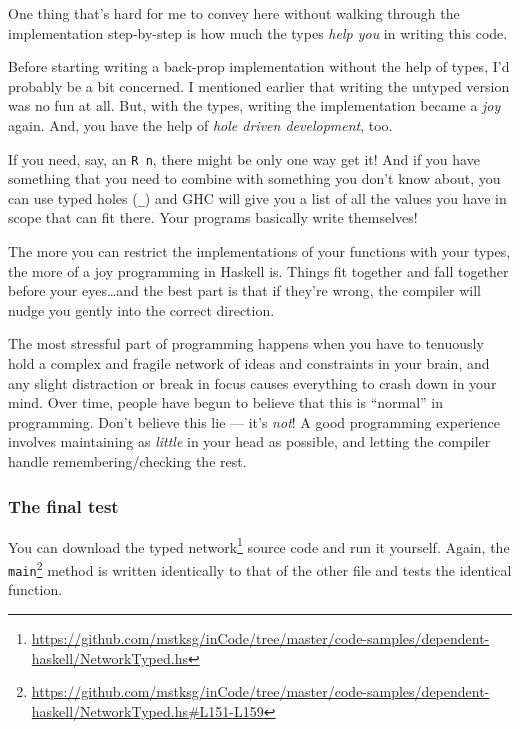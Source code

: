 \documentclass[]{article}
\renewcommand{\href}[2]{#2\footnote{\url{#1}}}
\begin{document}
One thing that's hard for me to convey here without walking through the
implementation step-by-step is how much the types \emph{help you} in writing
this code.

Before starting writing a back-prop implementation without the help of types,
I'd probably be a bit concerned. I mentioned earlier that writing the untyped
version was no fun at all. But, with the types, writing the implementation
became a \emph{joy} again. And, you have the help of \emph{hole driven
development}, too.

If you need, say, an \texttt{R\ n}, there might be only one way get it! And if
you have something that you need to combine with something you don't know about,
you can use typed holes (\texttt{\_}) and GHC will give you a list of all the
values you have in scope that can fit there. Your programs basically write
themselves!

The more you can restrict the implementations of your functions with your types,
the more of a joy programming in Haskell is. Things fit together and fall
together before your eyes\ldots and the best part is that if they're wrong, the
compiler will nudge you gently into the correct direction.

The most stressful part of programming happens when you have to tenuously hold a
complex and fragile network of ideas and constraints in your brain, and any
slight distraction or break in focus causes everything to crash down in your
mind. Over time, people have begun to believe that this is ``normal'' in
programming. Don't believe this lie --- it's \emph{not}! A good programming
experience involves maintaining as \emph{little} in your head as possible, and
letting the compiler handle remembering/checking the rest.

\subsubsection{The final test}\label{the-final-test}

You can download the
\href{https://github.com/mstksg/inCode/tree/master/code-samples/dependent-haskell/NetworkTyped.hs}{typed
network} source code and run it yourself. Again, the
\href{https://github.com/mstksg/inCode/tree/master/code-samples/dependent-haskell/NetworkTyped.hs\#L151-L159}{\texttt{main}}
method is written identically to that of the other file and tests the identical
function.
\end{document}
